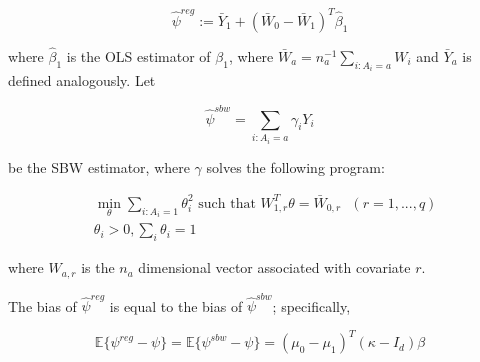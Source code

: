 $$
\hat{\psi}^{reg} := \bar{Y}_1 + (\bar{W}_0 - \bar{W}_1)^T\hat{\beta}_1
$$ 

where $\hat{\beta}_1$ is the OLS estimator of $\beta_1$, where $\bar{W}_a = n_a^{-1}\sum_{i:A_i = a} W_i$ and $\bar{Y}_a$ is defined analogously. Let 

$$
\hat{\psi}^{sbw} = \sum_{i: A_i = a} \gamma_i Y_i
$$ 

be the SBW estimator, where $\gamma$ solves the following program:

\begin{align*}
&\min_{\theta} \sum_{i: A_i = 1}\theta_i^2 \text{ such that } W_{1, r}^T\theta = \bar{W}_{0, r} \ \ \ (r = 1, ..., q) \\
&\theta_i > 0, \sum_i\theta_i = 1
\end{align*}

where $W_{a, r}$ is the $n_a$ dimensional vector associated with covariate $r$.

\begin{proposition}\label{cl1}
The bias of $\hat{\psi}^{reg}$ is equal to the bias of $\hat{\psi}^{sbw}$; specifically, 

$$
\mathbb{E}\{\psi^{reg} - \psi\} = \mathbb{E}\{\psi^{sbw} - \psi\} = (\mu_0 - \mu_1)^T(\kappa - I_d)\beta
$$
\end{proposition}

